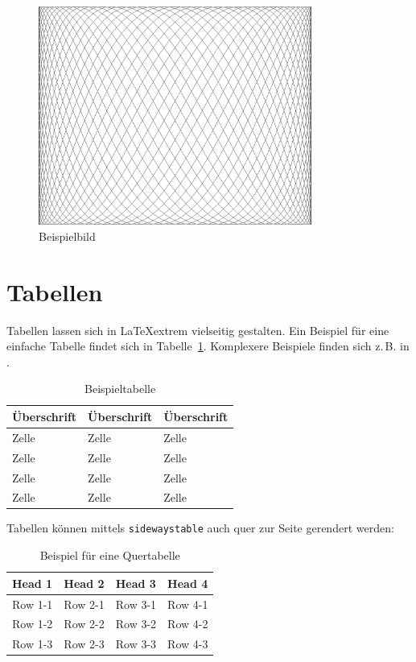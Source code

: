 \documentclass[12pt,oneside,a4paper,bibtotoc,liststotoc]{scrreprt}
\newcommand{\zB}{\mbox{z.\,B.}\xspace}
\begin{document}
\begin{figure}[H]
  \begin{centering}
    \includegraphics[width=0.8\textwidth]{img/example.png}
    \caption{Beispielbild}
    \label{example_image}
  \end{centering}
\end{figure}

\section{Tabellen}

Tabellen lassen sich in \LaTeX extrem vielseitig gestalten. Ein
Beispiel für eine einfache Tabelle findet sich in
Tabelle~\ref{example_table}. Komplexere Beispiele finden sich \zB in
\cite[][]{WikibookTables}.

\begin{table}
  \centering
  \begin{tabular}{l|ll}
    \toprule
    Überschrift & Überschrift & Überschrift \\
    \midrule
    Zelle & Zelle & Zelle \\
    Zelle & Zelle & Zelle \\
    Zelle & Zelle & Zelle \\
    Zelle & Zelle & Zelle \\
    \bottomrule
  \end{tabular}
  \caption{Beispieltabelle}
  \label{example_table}
\end{table}

Tabellen können mittels \texttt{sidewaystable} auch quer zur Seite
gerendert werden:

\begin{table}
  \centering
  \begin{tabular}{llll}
    \toprule
    Head 1 & Head 2 & Head 3 & Head 4 \\
    \midrule
    Row 1-1 & Row 2-1 & Row 3-1 & Row 4-1 \\
    Row 1-2 & Row 2-2 & Row 3-2 & Row 4-2 \\
    Row 1-3 & Row 2-3 & Row 3-3 & Row 4-3 \\
    \bottomrule
  \end{tabular}
  \caption{Beispiel für eine Quertabelle}
  \label{example_table2}
\end{table}
\end{document}
